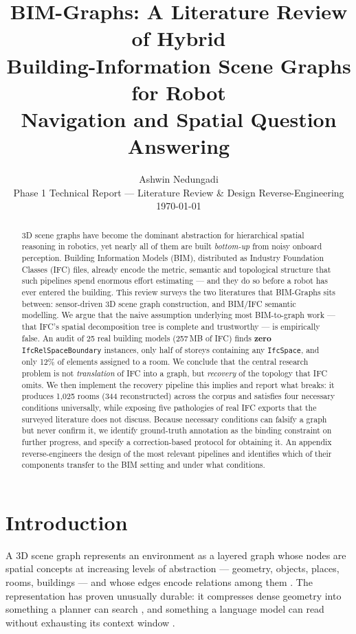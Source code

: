 \documentclass[10pt,twocolumn,letterpaper]{article}
\title{\vspace{-1.2em}\textbf{BIM-Graphs: A Literature Review of Hybrid\\
Building-Information Scene Graphs for Robot\\
Navigation and Spatial Question Answering}\vspace{-0.4em}}
\author{Ashwin Nedungadi\\
\small Phase 1 Technical Report --- Literature Review \& Design Reverse-Engineering\\
\small \today
\vspace{-1.5em}}
\date{}
\begin{document}
\maketitle

\begin{abstract}
\noindent
3D scene graphs have become the dominant abstraction for hierarchical spatial
reasoning in robotics, yet nearly all of them are built \emph{bottom-up} from
noisy onboard perception. Building Information Models (BIM), distributed as
Industry Foundation Classes (IFC) files, already encode the metric, semantic and
topological structure that such pipelines spend enormous effort estimating ---
and they do so before a robot has ever entered the building. This review surveys
the two literatures that BIM-Graphs sits between: sensor-driven 3D scene graph
construction, and BIM/IFC semantic modelling. We argue that the naive assumption
underlying most BIM-to-graph work --- that IFC's spatial decomposition tree is
complete and trustworthy --- is empirically false. An audit of 25 real building
models (257\,MB of IFC) finds \textbf{zero} \texttt{IfcRelSpaceBoundary}
instances, only half of storeys containing any \texttt{IfcSpace}, and only 12\%
of elements assigned to a room. We conclude that the central research problem is
not \emph{translation} of IFC into a graph, but \emph{recovery} of the topology
that IFC omits. We then implement the recovery pipeline this implies and report
what breaks: it produces 1{,}025 rooms (344 reconstructed) across the corpus and
satisfies four necessary conditions universally, while exposing five pathologies
of real IFC exports that the surveyed literature does not discuss. Because
necessary conditions can falsify a graph but never confirm it, we identify
ground-truth annotation as the binding constraint on further progress, and
specify a correction-based protocol for obtaining it. An appendix
reverse-engineers the design of the most relevant pipelines and identifies which
of their components transfer to the BIM setting and under what conditions.
\end{abstract}

\section{Introduction}

A 3D scene graph represents an environment as a layered graph whose nodes are
spatial concepts at increasing levels of abstraction --- geometry, objects,
places, rooms, buildings --- and whose edges encode relations among them
\cite{armeni20193d,rosinol2021kimera}. The representation has proven unusually
durable: it compresses dense geometry into something a planner can search
\cite{ray2024tamp}, and something a language model can read without exhausting
its context window \cite{rana2023sayplan}.
\end{document}
